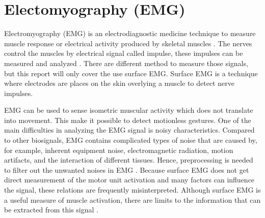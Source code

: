 \section{Electomyography (EMG)}
Electromyography (EMG) is an electrodiagnostic medicine technique to measure muscle response or electrical activity produced by skeletal muscles \cite{wiki:Electromyography}. The nerves control the muscles by electrical signal called impulse, these impulses can be measured and analyzed \cite{WebMD:Electromyogram}. There are different method to measure those signals, but this report will only cover the use surface EMG. Surface EMG is a technique where electrodes are places on the skin overlying a muscle to detect nerve impulses. 

EMG can be used to sense isometric muscular activity which does not translate into movement. This make it possible to detect motionless gestures. One of the main difficulties in analyzing the EMG signal is noisy characteristics. Compared to other biosignals, EMG contains complicated types of noise that are caused by, for example, inherent equipment noise, electromagnetic radiation, motion artifacts, and the interaction of different tissues. Hence, preprocessing is needed to filter out the unwanted noises in EMG \cite{kim2008emg}. Because surface EMG does not get direct measurement of the motor unit activation and many factors can influence the signal, these relations are frequently misinterpreted. Although surface EMG is a useful measure of muscle activation, there are limits to the information that can be extracted from this signal \cite{farina2004extraction}.